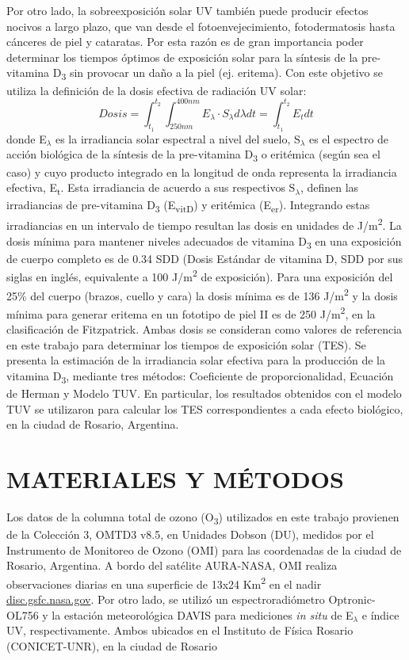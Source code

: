 \documentclass[10pt,twocolumn]{article}
\begin{document}
Por otro lado, la sobreexposición solar UV también puede producir efectos nocivos a largo plazo, que van desde el fotoenvejecimiento, fotodermatosis hasta cánceres de piel y cataratas.\cite{Gilaberte2011,Modenese2016} Por esta razón es de gran importancia poder determinar los tiempos óptimos de exposición solar para la síntesis de la pre-vitamina D\textsubscript{3} sin provocar un daño a la piel (ej. eritema). Con este objetivo se utiliza la definición de la dosis efectiva de radiación UV solar:
\begin{equation}
  Dosis=\int_{t_1}^{t_2} \int_{250nm}^{400nm} E_\lambda\cdot S_\lambda d\lambda dt = \int_{t_1}^{t_2}E_tdt \label{eq:dosis}
\end{equation}
donde E$_\lambda$ es la irradiancia solar espectral a nivel del suelo, S$_\lambda$ es el espectro de acción biológica de la síntesis de la pre-vitamina D\textsubscript{3} o eritémica (según sea el caso) y cuyo producto integrado en la longitud de onda representa la irradiancia efectiva, E\textsubscript{t}. Esta irradiancia de acuerdo a sus respectivos S$_\lambda$, definen las irradiancias de pre-vitamina D\textsubscript{3} (E\textsubscript{vitD}) y eritémica (E\textsubscript{er}). Integrando estas irradiancias en un intervalo de tiempo resultan las dosis en unidades de J/m\textsuperscript{2}.
La dosis mínima para mantener niveles adecuados de vitamina D\textsubscript{3} en una exposición de cuerpo completo es de 0.34 SDD (Dosis Estándar de vitamina D, SDD por sus siglas en inglés, equivalente a 100 J/m\textsuperscript{2} de exposición). Para una exposición del 25\% del cuerpo (brazos, cuello y cara) la dosis mínima es de 136 J/m\textsuperscript{2} y la dosis mínima para generar eritema en un fototipo de piel II es de 250 J/m\textsuperscript{2}, en la clasificación de Fitzpatrick.\cite{Fitzpatrick1988,UVDoses} Ambas dosis se consideran como valores de referencia en este trabajo para determinar los tiempos de exposición solar (TES). Se presenta la estimación de la irradiancia solar efectiva para la producción de la vitamina D\textsubscript{3}, mediante tres métodos: Coeficiente de proporcionalidad,\cite{UVDoses} Ecuación de Herman\cite{Herman2010} y Modelo TUV.\cite{Madronich1987} En particular, los resultados obtenidos con el modelo TUV se utilizaron para calcular los TES correspondientes a cada efecto biológico, en la ciudad de Rosario, Argentina.

\section{MATERIALES Y MÉTODOS}
Los datos de la columna total de ozono (O\textsubscript{3}) utilizados en este trabajo provienen de la Colección 3, OMTD3 v8.5, en Unidades Dobson (DU), medidos por el Instrumento de Monitoreo de Ozono (OMI) para las coordenadas de la ciudad de Rosario, Argentina. A bordo del satélite AURA-NASA, OMI realiza observaciones diarias en una superficie de 13x24 Km\textsuperscript{2} en el nadir \href{(disc.gsfc.nasa.gov)}{\url{disc.gsfc.nasa.gov}}. Por otro lado, se utilizó un espectroradiómetro Optronic-OL756 y la estación meteorológica DAVIS para mediciones \emph{in situ} de E$_\lambda$ e índice UV, respectivamente. Ambos ubicados en el Instituto de Física Rosario (CONICET-UNR), en la ciudad de Rosario
\end{document}
